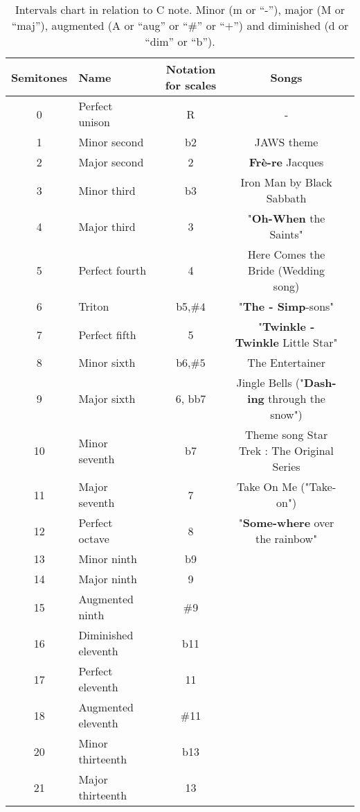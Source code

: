 \begin{table*}[!h]
	\caption{Intervals chart in relation to C note. Minor (m or ``-''), major (M or ``maj''), augmented (A or ``aug'' or ``$\#$'' or ``$+$'') and diminished (d or ``dim'' or ``b''). }
	\centering
	\begin{adjustwidth}{-2cm}{}
	\begin{tabular}{clccl}
		\hline 
		\textbf{Semitones} & \textbf{Name}  & \textbf{Notation for scales} &  \textbf{Songs}  \\
		\hline
		0 & Perfect unison            & R & -   \\
		\hline
		1 & Minor second              &  b2 & JAWS theme \\
		2 & Major second              &   2 & \textbf{Frè-re} Jacques  \\
		\hline
		3 & Minor third               &  b3 & Iron Man by Black Sabbath\\
		4 & Major third               &  3 & "\textbf{Oh-When} the Saints" \\
		\hline
		5 & Perfect fourth            &  4 & Here Comes the Bride (Wedding song) \\
		\hline
		6 & Triton                    &  b5,$\#4$  & "\textbf{The - Simp}-sons" \\
		\hline
		7 & Perfect fifth             &  5 &"\textbf{Twinkle - Twinkle} Little Star"   \\
		\hline
		8 & Minor sixth               &  b6,$\#5$ & The Entertainer \\
		9 & Major sixth               &  6, bb7 & Jingle Bells ("\textbf{Dash-ing} through the snow")   \\
		\hline
		10 & Minor seventh            &  b7 & Theme song Star Trek : The Original Series\\
		11 & Major seventh            &  7 & Take On Me ("Take-on")  \\
		\hline
		12 & Perfect octave           & 8 & "\textbf{Some-where} over the rainbow" \\
		\hline
		13 & Minor ninth              & b9 \\
		14 & Major ninth              &  9 \\
		15 & Augmented ninth          &  $\#$9 \\
		\hline
		16 & Diminished eleventh      & b11 \\
		17 & Perfect eleventh         & 11 \\
		18 & Augmented eleventh       & $\#$11 \\
		\hline
		20 & Minor thirteenth         & b13 \\
		21 & Major thirteenth         & 13 \\
		\hline
	\end{tabular}
	\end{adjustwidth}
	\label{tab: }
\end{table*}
